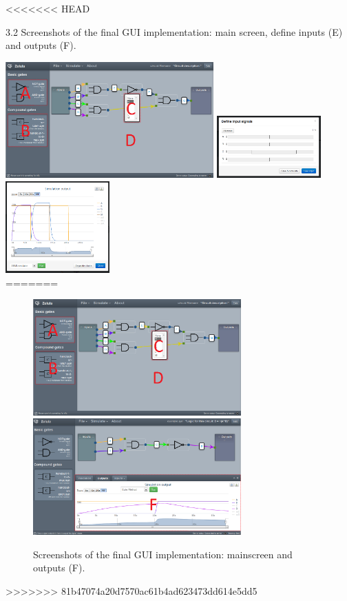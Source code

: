 \documentclass[a4paper]{article}
\begin{document}
<<<<<<< HEAD
\centerline{\small 3.2 Screenshots of the final GUI implementation: main screen, define inputs (E) and outputs (F).}
\noindent \includegraphics[width=8cm]{pictures/gui_final1_marks.png} 
\includegraphics[width=4cm]{pictures/gui_final_inputselect.png}
\includegraphics[width=4cm]{pictures/gui_final_output.png}\\
=======
\begin{figure}[h!]
\includegraphics[width=8cm]{pictures/gui_final1_marks.png} 
\includegraphics[width=8cm]{pictures/gui_final2_marks.png}
\caption{Screenshots of the final GUI implementation: mainscreen and outputs (F).}
\end{figure}
>>>>>>> 81b47074a20d7570ac61b4ad623473dd614e5dd5
\end{document}

